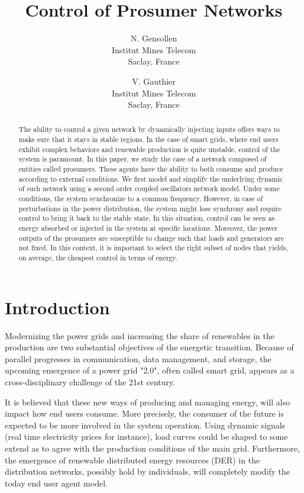 \documentclass[10pt,twoside%
                ,draft%
        ]{article}
\title{Control of Prosumer Networks}
\author{
        N. Gensollen\\
        Institut Mines Telecom\\
        Saclay, France
\and
        V. Gauthier\\
        Institut Mines Telecom\\
        Saclay, France
}
\begin{document}
\maketitle


\begin{abstract}
The ability to control a given network by  dynamically injecting inputs offers ways to make sure that it stays in stable regions. In the case of smart grids, where end users exhibit complex behaviors and renewable production is quite unstable, control of the system  is paramount. In this paper, we study the case of a network composed of entities called prosumers. These agents have the ability to both consume and produce according to external conditions. We first model and simplify the underlying dynamic of such network using a second order coupled oscillators network model. Under some conditions, the system synchronize to a common frequency. However, in case of perturbations in the power distribution, the system might lose synchrony and require control to bring it back to the stable state. In this situation, control can be seen as energy  absorbed or injected in the system at specific locations. Moreover, the power outputs of the prosumers are susceptible to change such that loads and generators are not fixed. In this context, it is important to select the right subset
of nodes that yields, on average, the cheapest control in terms of energy. 


\end{abstract}



\section{Introduction}

Modernizing the power grids and increasing the share of renewables in the production are two substantial objectives of the energetic transition. Because of parallel progresses in communication, data management, and storage, the upcoming emergence of a power grid "2.0", often called smart grid, appears as a cross-disciplinary challenge of the 21st century.

It is believed that these new ways of producing and managing energy, will also impact how end users consume. More precisely, the consumer   of the future is expected to be more involved in the system operation. Using dynamic signals (real time electricity prices for instance), load curves could be shaped to some extend as to agree with the production conditions of the main grid.
Furthermore, the emergence of renewable distributed energy 
 resources (DER) in the distribution networks, possibly hold by individuals,
will completely  
modify the today end user agent model.
\end{document}
